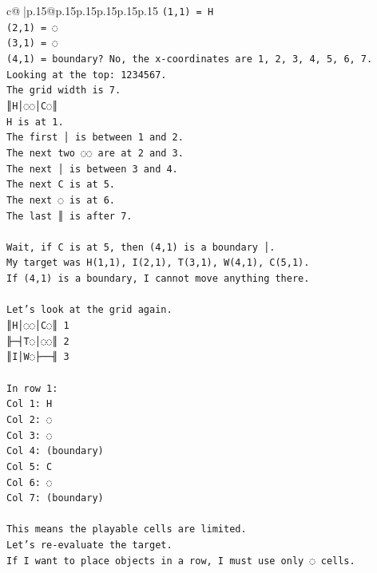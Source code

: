 \documentclass{article}
\begin{document}
{\begin{supertabular}{c@{$\;$}|p{.15\linewidth}@{}p{.15\linewidth}p{.15\linewidth}p{.15\linewidth}p{.15\linewidth}p{.15\linewidth}}
{{{\texttt{(1,1) = H} \\
\texttt{(2,1) = ◌} \\
\texttt{(3,1) = ◌} \\
\texttt{(4,1) = boundary? No, the x{-}coordinates are 1, 2, 3, 4, 5, 6, 7.} \\
\texttt{Looking at the top: 1234567.} \\
\texttt{The grid width is 7.} \\
\texttt{║H│◌◌│C◌║} \\
\texttt{H is at 1.} \\
\texttt{The first │ is between 1 and 2.} \\
\texttt{The next two ◌◌ are at 2 and 3.} \\
\texttt{The next │ is between 3 and 4.} \\
\texttt{The next C is at 5.} \\
\texttt{The next ◌ is at 6.} \\
\texttt{The last ║ is after 7.} \\
\\ 
\texttt{Wait, if C is at 5, then (4,1) is a boundary │.} \\
\texttt{My target was H(1,1), I(2,1), T(3,1), W(4,1), C(5,1).} \\
\texttt{If (4,1) is a boundary, I cannot move anything there.} \\
\\ 
\texttt{Let's look at the grid again.} \\
\texttt{║H│◌◌│C◌║ 1} \\
\texttt{╟─┤T◌│◌◌║ 2} \\
\texttt{║I│W◌├──╢ 3} \\
\\ 
\texttt{In row 1:} \\
\texttt{Col 1: H} \\
\texttt{Col 2: ◌} \\
\texttt{Col 3: ◌} \\
\texttt{Col 4: (boundary)} \\
\texttt{Col 5: C} \\
\texttt{Col 6: ◌} \\
\texttt{Col 7: (boundary)} \\
\\ 
\texttt{This means the playable cells are limited.} \\
\texttt{Let's re{-}evaluate the target.} \\
\texttt{If I want to place objects in a row, I must use only ◌ cells.} \\
}}}
\end{supertabular}}
\end{document}
